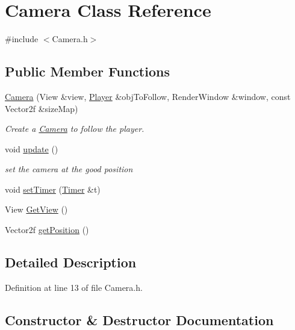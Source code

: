 \hypertarget{class_camera}{}\section{Camera Class Reference}
\label{class_camera}


{\ttfamily \#include $<$Camera.\+h$>$}

\subsection*{Public Member Functions}
\begin{DoxyCompactItemize}
\item 
\hyperlink{class_camera_a96a2da7cc4bb17b4a68ae236528c1b47}{Camera} (View \&view, \hyperlink{class_player}{Player} \&obj\+To\+Follow, Render\+Window \&window, const Vector2f \&size\+Map)
\begin{DoxyCompactList}\small\item\em Create a \hyperlink{class_camera}{Camera} to follow the player. \end{DoxyCompactList}\item 
void \hyperlink{class_camera_a42cda7239981a5618660d04bd5893556}{update} ()
\begin{DoxyCompactList}\small\item\em set the camera at the good position \end{DoxyCompactList}\item 
void \hyperlink{class_camera_aa4a2ea30c94998c0222fdffe02a499f1}{set\+Timer} (\hyperlink{struct_timer}{Timer} \&t)
\item 
View \hyperlink{class_camera_a14474d1aabd7268f7aa922fe30647365}{Get\+View} ()
\item 
Vector2f \hyperlink{class_camera_ab3b9ec6e34ef3b004d9061d96d71302f}{get\+Position} ()
\end{DoxyCompactItemize}


\subsection{Detailed Description}


Definition at line 13 of file Camera.\+h.



\subsection{Constructor \& Destructor Documentation}
\mbox{\label{class_camera_a96a2da7cc4bb17b4a68ae236528c1b47}} 
